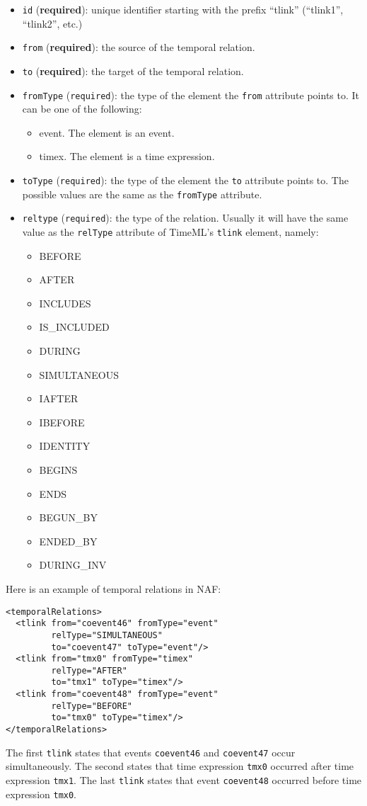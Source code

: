 \begin{itemize}
\item \texttt{id} (\textbf{required}): unique identifier starting with
  the prefix ``tlink'' (``tlink1'', ``tlink2'', etc.)
\item \texttt{from} (\textbf{required}): the source of the temporal relation.
\item \texttt{to} (\textbf{required}): the target of the temporal relation.
\item \texttt{fromType} (\texttt{required}): the type of the element the
  \texttt{from} attribute points to. It can be one of the following:
  \begin{itemize}
  \item event. The element is an event.
  \item timex. The element is a time expression.
  \end{itemize}
\item \texttt{toType} (\texttt{required}): the type of the element the
  \texttt{to} attribute points to. The possible values are the same as the
  \texttt{fromType} attribute.
\item \texttt{reltype} (\texttt{required}): the type of the
  relation. Usually it will have the same value as the \texttt{relType}
  attribute of TimeML's \texttt{tlink} element, namely:
  \begin{itemize}
  \item BEFORE
  \item AFTER
  \item INCLUDES
  \item IS\_INCLUDED
  \item DURING
  \item SIMULTANEOUS
  \item IAFTER
  \item IBEFORE
  \item IDENTITY
  \item BEGINS
  \item ENDS
  \item BEGUN\_BY
  \item ENDED\_BY
  \item DURING\_INV
  \end{itemize}
\end{itemize}

Here is an example of temporal relations in NAF:
\begin{Verbatim}
<temporalRelations>
  <tlink from="coevent46" fromType="event"
         relType="SIMULTANEOUS"
         to="coevent47" toType="event"/>
  <tlink from="tmx0" fromType="timex"
         relType="AFTER"
         to="tmx1" toType="timex"/>
  <tlink from="coevent48" fromType="event"
         relType="BEFORE"
         to="tmx0" toType="timex"/>
</temporalRelations>
\end{Verbatim}

The first \texttt{tlink} states that events \texttt{coevent46} and
\texttt{coevent47} occur simultaneously. The second states that time
expression \texttt{tmx0} occurred after time expression \texttt{tmx1}. The
last \texttt{tlink} states that event \texttt{coevent48} occurred before
time expression \texttt{tmx0}.

